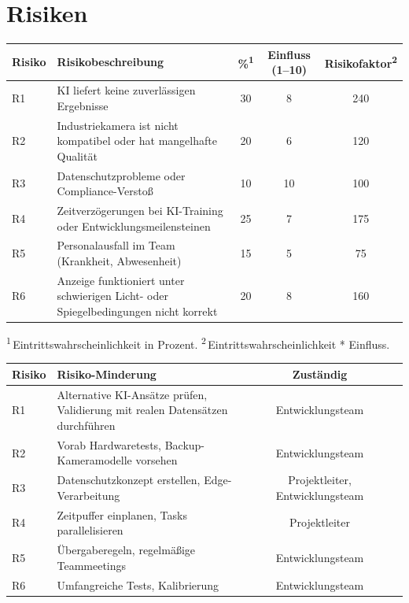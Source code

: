 \chapter{Risiken}

\begin{table}[h!]
\centering
\begin{tabular}{|l|p{6cm}|c|c|c|}
\hline
\textbf{Risiko} & \textbf{Risikobeschreibung} & \textbf{\%\textsuperscript{1}} & \textbf{Einfluss (1–10)} & \textbf{Risikofaktor\textsuperscript{2}} \\
\hline
R1 & KI liefert keine zuverlässigen Ergebnisse & 30 & 8 & 240 \\
\hline
R2 & Industriekamera ist nicht kompatibel oder hat mangelhafte Qualität & 20 & 6 & 120 \\
\hline
R3 & Datenschutzprobleme oder Compliance-Verstoß & 10 & 10 & 100 \\
\hline  
R4 & Zeitverzögerungen bei KI-Training oder Entwicklungsmeilensteinen & 25 & 7 & 175 \\
\hline
R5 & Personalausfall im Team (Krankheit, Abwesenheit) & 15 & 5 & 75 \\
\hline
R6 & Anzeige funktioniert unter schwierigen Licht- oder Spiegelbedingungen nicht korrekt & 20 & 8 & 160 \\
\hline
\end{tabular}

\vspace{3pt}
\begin{flushleft}
\footnotesize\textsuperscript{1}\,Eintrittswahrscheinlichkeit in Prozent.
\footnotesize\textsuperscript{2}\,Eintrittswahrscheinlichkeit * Einfluss.
\end{flushleft}

\end{table}

\begin{table}[h!]
\centering
\begin{tabular}{|l|p{7cm}|c|c|c|}
\hline
\textbf{Risiko} & \textbf{Risiko-Minderung} & \textbf{Zuständig} \\
\hline
R1 & Alternative KI-Ansätze prüfen, Validierung mit realen Datensätzen durchführen & Entwicklungsteam \\
\hline
R2 & Vorab Hardwaretests, Backup-Kameramodelle vorsehen & Entwicklungsteam \\
\hline
R3 & Datenschutzkonzept erstellen, Edge-Verarbeitung & Projektleiter, Entwicklungsteam \\
\hline
R4 & Zeitpuffer einplanen, Tasks parallelisieren & Projektleiter \\
\hline
R5 & Übergaberegeln, regelmäßige Teammeetings & Entwicklungsteam \\
\hline
R6 & Umfangreiche Tests, Kalibrierung & Entwicklungsteam \\
\hline
\end{tabular}



\end{table}